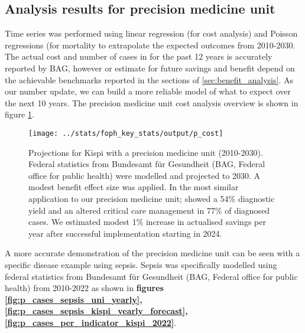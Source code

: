 \subsection{Analysis results for precision medicine unit}
Time series was performed using linear regression (for cost analysis) and Poisson regressions (for mortality  to extrapolate the expected outcomes from 2010-2030.
The actual cost and number of cases in for the past 12 years is accurately reported by BAG, however or estimate for future savings and benefit depend on the achievable benchmarks reported in the  sections of \ref{sec:benefit_analysis}.
As our number update, we can build a more reliable model of what to expect over the next 10 years. 
The precision medicine unit cost analysis overview is shown in figure 
\ref{fig:cost_analysis}.

\begin{figure}[h] \hspace*{0cm} 
\begin{center}
	\texttt{[image: ../stats/foph\_key\_stats/output/p\_cost]}
	\caption{Projections for Kispi with a precision medicine unit (2010-2030). Federal statistics from Bundesamt für Gesundheit (BAG, Federal office for public health) were modelled and projected to 2030. A modest benefit effect size was applied. 
	In the most similar application to our precision medicine unit; 
	\citet{lunke2023integrated} 
	showed a 54\% diagnostic yield and an altered critical care management in 77\% of diagnosed cases.
	We estimated modest 1\% increase in actualised savings per year after successful implementation starting in 2024.}
	\label{fig:cost_analysis}
\end{center}
\end{figure}

A more accurate demonstration of the precision medicine unit can be seen with a specific disease example using sepsis.
Sepsis was specifically modelled using federal statistics from Bundesamt für Gesundheit (BAG, Federal office for public health) from 2010-2022 as shown in 
\textbf{figures
\ref{fig:p_cases_sepsis_uni_yearly},
\ref{fig:p_cases_sepsis_kispi_yearly_forecast},
\ref{fig:p_cases_per_indicator_kispi_2022}}.


